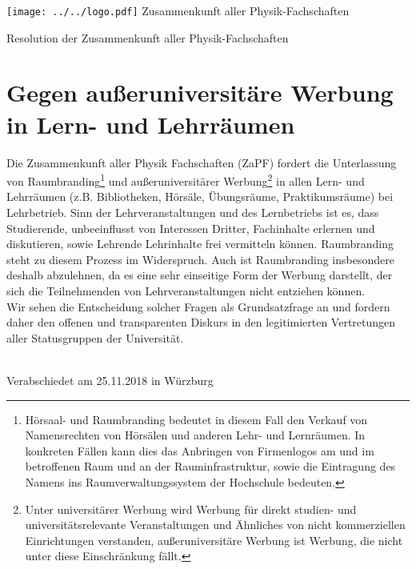 \documentclass[DIV=calc]{scrartcl}
\begin{document}
    \hspace{0.87\textwidth}
    \begin{minipage}{120pt}
        \vspace{-1.8cm}
        \texttt{[image: ../../logo.pdf]}
        \centering
        \small Zusammenkunft aller Physik-Fachschaften
    \end{minipage}
    \begin{center}
        \huge{Resolution der Zusammenkunft aller Physik-Fachschaften}\vspace{.25\baselineskip}\\
        \normalsize
    \end{center}
    \vspace{1cm}

\section*{Gegen außeruniversitäre Werbung in Lern- und Lehrräumen}
Die Zusammenkunft aller Physik Fachschaften (ZaPF) fordert die Unterlassung von Raumbranding\footnote{Hörsaal- und Raumbranding bedeutet in diesem Fall den Verkauf von Namensrechten von
Hörsälen und anderen Lehr- und Lernräumen. In konkreten Fällen kann dies das Anbringen von
Firmenlogos am und im betroffenen Raum und an der Rauminfrastruktur, sowie die Eintragung des
Namens ins Raumverwaltungssystem der Hochschule bedeuten.} und außeruniversitärer Werbung\footnote{Unter universitärer Werbung wird Werbung für direkt studien- und universitätsrelevante
Veranstaltungen und Ähnliches von nicht kommerziellen Einrichtungen verstanden,
außeruniversitäre Werbung ist Werbung, die nicht unter diese Einschränkung fällt.} in allen Lern- und Lehrräumen (z.B. Bibliotheken, Hörsäle,
Übungsräume, Praktikumsräume) bei Lehrbetrieb.
Sinn der Lehrveranstaltungen und des Lernbetriebs ist es, dass Studierende, unbeeinflusst von
Interessen Dritter, Fachinhalte erlernen und diskutieren, sowie Lehrende Lehrinhalte frei vermitteln
können. Raumbranding steht zu diesem Prozess im Widerspruch.
Auch ist Raumbranding insbesondere deshalb abzulehnen, da es eine sehr einseitige Form der
Werbung darstellt, der sich die Teilnehmenden von Lehrveranstaltungen nicht entziehen können.\\
Wir sehen die Entscheidung solcher Fragen als Grundsatzfrage an und fordern daher den offenen
und transparenten Diskurs in den legitimierten Vertretungen aller Statusgruppen der Universität.\vspace{2\baselineskip}\\~
\vfill
    \begin{flushright}
        Verabschiedet am 25.11.2018 in Würzburg
    \end{flushright}
\end{document}
